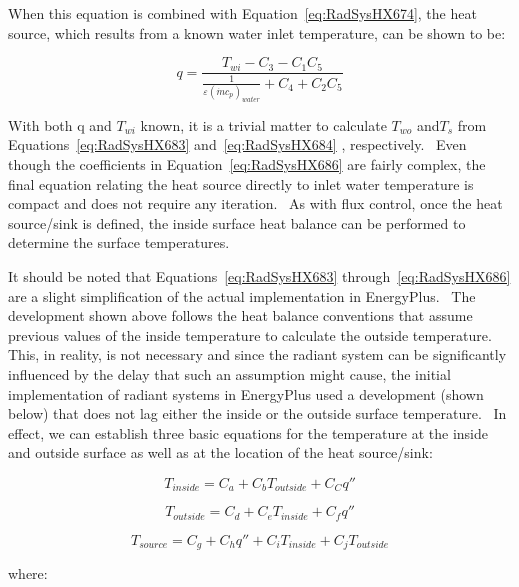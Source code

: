 When this equation is combined with Equation~\ref{eq:RadSysHX674}, the heat source, which results from a known water inlet temperature, can be shown to be:

\begin{equation}
q = \frac{{{T_{wi}} - {C_3} - {C_1}{C_5}}}{{\frac{1}{{\varepsilon {{\left( {\dot m{c_p}} \right)}_{water}}}} + {C_4} + {C_2}{C_5}}}
\label{eq:RadSysHX686}
\end{equation}

With both q and \(T_{wi}\) known, it is a trivial matter to calculate \(T_{wo}\) and\(T_s\) from Equations~\ref{eq:RadSysHX683} and~\ref{eq:RadSysHX684} , respectively.~ Even though the coefficients in Equation~\ref{eq:RadSysHX686} are fairly complex, the final equation relating the heat source directly to inlet water temperature is compact and does not require any iteration.~ As with flux control, once the heat source/sink is defined, the inside surface heat balance can be performed to determine the surface temperatures.

It should be noted that Equations~\ref{eq:RadSysHX683} through~\ref{eq:RadSysHX686} are a slight simplification of the actual implementation in EnergyPlus.~ The development shown above follows the heat balance conventions that assume previous values of the inside temperature to calculate the outside temperature.~ This, in reality, is not necessary and since the radiant system can be significantly influenced by the delay that such an assumption might cause, the initial implementation of radiant systems in EnergyPlus used a development (shown below) that does not lag either the inside or the outside surface temperature.~ In effect, we can establish three basic equations for the temperature at the inside and outside surface as well as at the location of the heat source/sink:

\begin{equation}
{T_{inside}} = {C_a} + {C_b}{T_{outside}} + {C_C}q''
\label{eq:RadSysHX687}
\end{equation}

\begin{equation}
{T_{outside}} = {C_d} + {C_e}{T_{inside}} + {C_f}q''
\label{eq:RadSysHX688}
\end{equation}

\begin{equation}
{T_{source}} = {C_g} + {C_h}q'' + {C_i}{T_{inside}} + {C_j}{T_{outside}}
\end{equation}

where:

